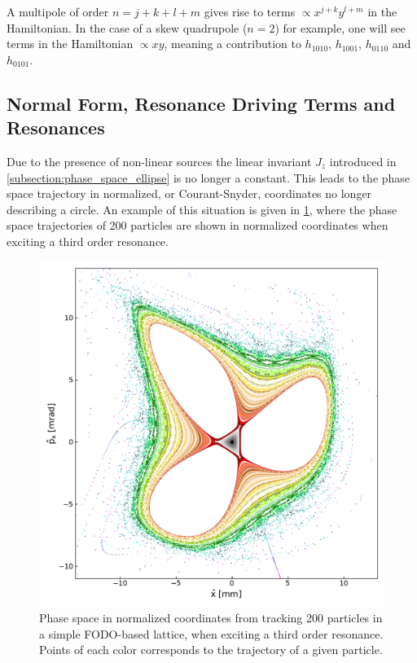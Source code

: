 A multipole of order \(n = j + k + l + m\) gives rise to terms \(\propto x^{j+k} y^{l+m}\) in the Hamiltonian.
In the case of a skew quadrupole (\(n=2\)) for example, one will see terms in the Hamiltonian \(\propto xy\), meaning a contribution to \(h_{1010}\), \(h_{1001}\), \(h_{0110}\) and \(h_{0101}\).

\subsection{Normal Form, Resonance Driving Terms and Resonances}
\label{subsection:normal_form_and_rdt}

Due to the presence of non-linear sources the linear invariant \(J_z\) introduced in \cref{subsection:phase_space_ellipse} is no longer a constant.
This leads to the phase space trajectory in normalized, or Courant-Snyder, coordinates no longer describing a circle.
An example of this situation is given in \cref{figure:phase_space_third_order_resonance}, where the phase space trajectories of \num{200} particles are shown in normalized coordinates when exciting a third order resonance.

\begin{figure}[!htb]
    \begin{center}
    \includegraphics[width = 0.9\linewidth]{Figures/Beam_Dynamics_Theory/phase_space_third_order_resonance.pdf}
    \caption{Phase space in normalized coordinates from tracking \num{200} particles in a simple FODO-based lattice, when exciting a third order resonance. Points of each color corresponds to the trajectory of a given particle.}
    \label{figure:phase_space_third_order_resonance}
    \end{center}
\end{figure}

